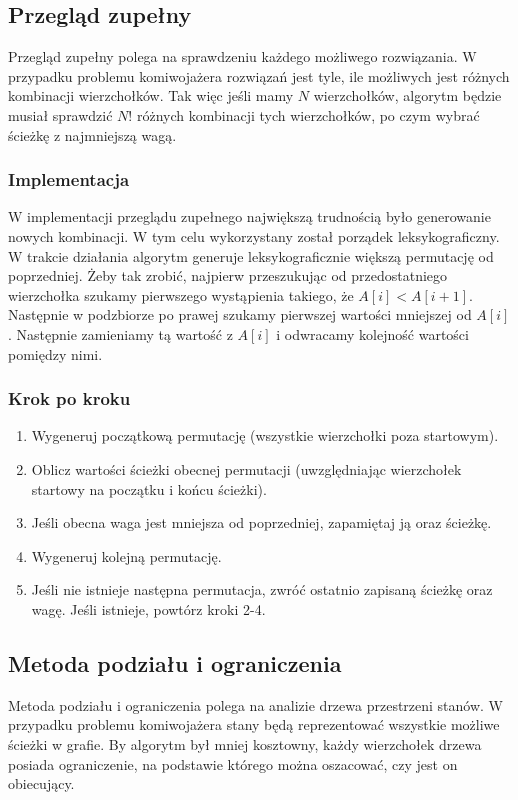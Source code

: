 \documentclass{article}
\begin{document}
\subsection{Przegląd zupełny}
Przegląd zupełny polega na sprawdzeniu każdego możliwego rozwiązania. W przypadku problemu komiwojażera rozwiązań jest tyle, ile możliwych jest różnych kombinacji wierzchołków. Tak więc jeśli mamy $N$ wierzchołków, algorytm będzie musiał sprawdzić $N!$ różnych kombinacji tych wierzchołków, po czym wybrać ścieżkę z najmniejszą wagą.

\subsubsection{Implementacja}
W implementacji przeglądu zupełnego największą trudnością było generowanie nowych kombinacji. W tym celu wykorzystany został porządek leksykograficzny. W trakcie działania algorytm generuje leksykograficznie większą permutację od poprzedniej. Żeby tak zrobić, najpierw przeszukując od przedostatniego wierzchołka szukamy pierwszego wystąpienia takiego, że $A[i] < A[i+1]$. Następnie w podzbiorze po prawej szukamy pierwszej wartości mniejszej od $A[i]$. Następnie zamieniamy tą wartość z $A[i]$ i odwracamy kolejność wartości pomiędzy nimi. 


\subsubsection{Krok po kroku}
\begin{enumerate}
    \item Wygeneruj początkową permutację (wszystkie wierzchołki poza startowym).
    \item Oblicz wartości ścieżki obecnej permutacji (uwzględniając wierzchołek startowy na początku i końcu ścieżki).
    \item Jeśli obecna waga jest mniejsza od poprzedniej, zapamiętaj ją oraz ścieżkę.
    \item Wygeneruj kolejną permutację.
    \item Jeśli nie istnieje następna permutacja, zwróć ostatnio zapisaną ścieżkę oraz wagę. Jeśli istnieje, powtórz kroki 2-4.
\end{enumerate}


\subsection{Metoda podziału i ograniczenia}
Metoda podziału i ograniczenia polega na analizie drzewa przestrzeni stanów. W przypadku problemu komiwojażera stany będą reprezentować wszystkie możliwe ścieżki w grafie. By algorytm był mniej kosztowny, każdy wierzchołek drzewa posiada ograniczenie, na podstawie którego można oszacować, czy jest on obiecujący.  
\end{document}
